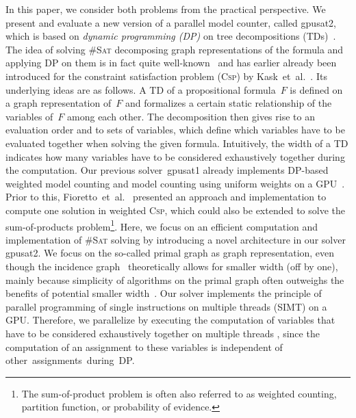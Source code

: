 \documentclass{llncs}
\makeatletter
\newcommand{\longversion}[1]{#1}
\newcommand{\shortversion}[1]{}
\newcommand{\CSP}{\textsc{Csp}\xspace}%
\newcommand{\cSAT}{\textsc{\#Sat}\xspace}%
\newcommand{\gpusatnu}{{\small\textsf{gpusat2}}\xspace}
\newcommand{\gpusatone}{{\small\textsf{gpusat1}}\xspace}
\newcommand{\etal}{et~al.\@\xspace}
\makeatother
\begin{document}
In this paper, we consider both problems from the practical
perspective. We present and evaluate a new version of a parallel model
counter, called \gpusatnu, which is based on \emph{dynamic programming
  (DP)} on tree decompositions (TDs)~\cite{SamerSzeider10b}.
%
The idea of solving \cSAT decomposing graph representations of the
formula and applying DP on them is in fact quite
well-known~\cite{SamerSzeider10b} and has earlier already been
introduced for the constraint satisfaction problem (\CSP) by
Kask~\etal~\cite{KaskEtAl01a}.
%
%
Its underlying ideas are as follows.  A TD of a propositional
formula~$F$ is defined on a graph representation of~$F$ and formalizes
a certain static relationship of the variables of~$F$ among each
other. The decomposition then gives rise to an evaluation order and to
sets of variables, which define which variables have to be evaluated
together when solving the given formula. Intuitively, the width of a
TD indicates how many variables have to be considered exhaustively
together during the computation.
%
Our previous solver~\gpusatone{} already implements DP-based weighted
model counting and model counting using uniform weights on a
GPU~\cite{FichteEtAl18c}.
%
%
%
%
Prior to this,
Fioretto~\etal~\cite{FiorettoPontelliYeoh18} presented an approach and
implementation to compute one solution in weighted \CSP, which could
also be extended to solve the sum-of-products problem\footnote{The
  sum-of-product problem is often also referred to as weighted
  counting, partition function, or probability of evidence.}.
%
%
Here, we focus on an efficient computation and implementation of \cSAT
solving by introducing a novel architecture in our solver \gpusatnu.
%
%
We focus on the so-called primal graph as graph representation, even
though the incidence graph~\cite{SamerSzeider10b} theoretically allows
for smaller width (off by one), mainly because simplicity of
algorithms on the primal graph often outweighs the benefits of
potential smaller
width~\cite{FichteEtAl17a,FichteEtAl18c}. %
%
%
%
%
Our solver implements the principle of parallel programming of single
instructions on multiple threads (SIMT) on a GPU. Therefore, we
parallelize by executing the computation of variables that have to be
considered exhaustively together on multiple threads\shortversion{.}%
\longversion{, since the
computation of an assignment to these variables is independent of
other~assignments~during~DP. } %
%
%
%
%
%
%

%
\end{document}
